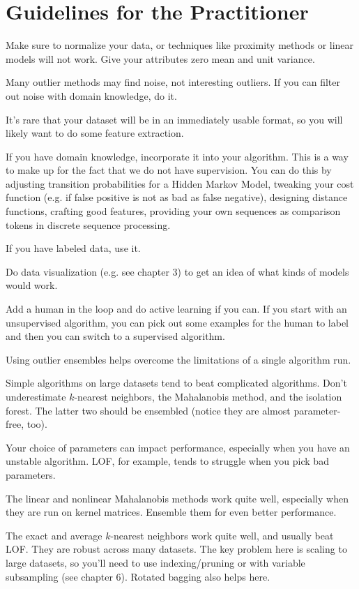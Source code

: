 \documentclass[a4paper]{article}
\begin{document}
\section{Guidelines for the Practitioner}
Make sure to normalize your data, or techniques like proximity methods or linear
models will not work. Give your attributes zero mean and unit variance.

Many outlier methods may find noise, not interesting outliers. If you can filter
out noise with domain knowledge, do it.

It's rare that your dataset will be in an immediately usable format, so you
will likely want to do some feature extraction.

If you have domain knowledge, incorporate it into your algorithm. This is a
way to make up for the fact that we do not have supervision. You can do this
by adjusting transition probabilities for a Hidden Markov Model, tweaking
your cost function (e.g. if false positive is not as bad as false negative),
designing distance functions, crafting good features, providing your own
sequences as comparison tokens in discrete sequence processing.

If you have labeled data, use it.

Do data visualization (e.g. see chapter 3) to get an idea of what kinds of
models would work.

Add a human in the loop and do active learning if you can. If you start with
an unsupervised algorithm, you can pick out some examples for the human to label
and then you can switch to a supervised algorithm.

Using outlier ensembles helps overcome the limitations of a single algorithm run.

Simple algorithms on large datasets tend to beat complicated algorithms. Don't
underestimate $k$-nearest neighbors, the Mahalanobis method, and the isolation
forest. The latter two should be ensembled (notice they are almost parameter-free,
too).

Your choice of parameters can impact performance, especially when you have
an unstable algorithm. LOF, for example, tends to struggle when you pick bad
parameters.

The linear and nonlinear Mahalanobis methods work quite well, especially when
they are run on kernel matrices. Ensemble them for even better performance.

The exact and average $k$-nearest neighbors work quite well, and usually beat
LOF. They are robust across many datasets. The key problem here is scaling to
large datasets, so you'll need to use indexing/pruning or with variable
subsampling (see chapter 6). Rotated bagging also helps here.
\end{document}
